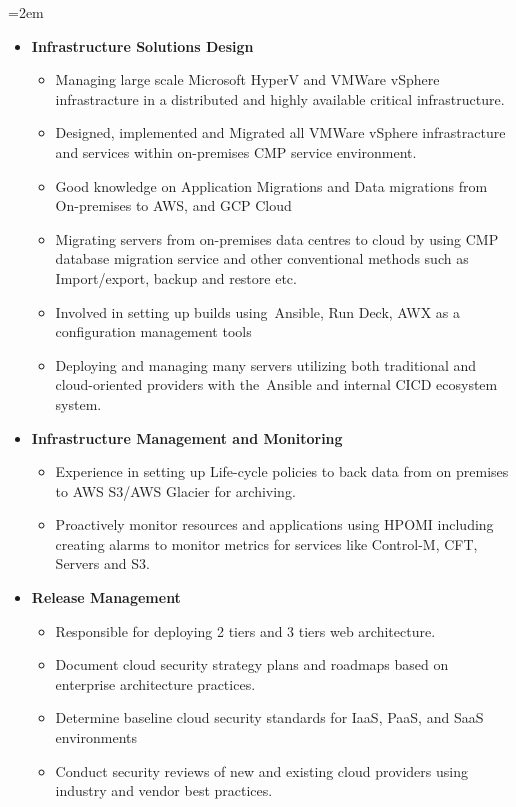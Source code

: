 \documentclass{scrartcl}
\newcommand{\MarginText}[1]{\marginpar{\raggedleft\itshape\small#1}} %
\newcommand{\Description}[1]{\hangindent=2em\hangafter=0\noindent\raggedright\footnotesize{#1}\par\normalsize\vspace{1em}} %
\begin{document}
\begin{cv}{}
\Description{\MarginText{Credit Agricole, Singapore}
	\begin{itemize}
		\item \textbf{Infrastructure Solutions Design}
		\begin{itemize}
			\item Managing large scale Microsoft HyperV and VMWare vSphere infrastracture in a distributed and highly available critical infrastructure.
			\item Designed, implemented and Migrated all VMWare vSphere infrastracture and services within on-premises CMP service environment.
			\item Good knowledge on Application Migrations and Data migrations from On-premises to AWS, and GCP Cloud
			\item Migrating servers from on-premises data centres to cloud by using CMP database migration service and other conventional methods such as Import/export, backup and restore etc.
			\item Involved in setting up builds using Ansible, Run Deck, AWX as a configuration management tools
			\item Deploying and managing many servers utilizing both traditional and cloud-oriented providers with the Ansible and internal CICD ecosystem system.
		\end{itemize}
		\item \textbf{Infrastructure Management and Monitoring}
		\begin{itemize}
			\item Experience in setting up Life-cycle policies to back data from on premises to AWS S3/AWS Glacier for archiving.
			\item Proactively monitor resources and applications using HPOMI including creating alarms to monitor metrics for services like Control-M, CFT, Servers and S3.
		\end{itemize}
		\item \textbf{Release Management}
		\begin{itemize}
			\item Responsible for deploying 2 tiers and 3 tiers web architecture.
			\item Document cloud security strategy plans and roadmaps based on enterprise architecture practices.
			\item Determine baseline cloud security standards for IaaS, PaaS, and SaaS environments
			\item Conduct security reviews of new and existing cloud providers using industry and vendor best practices.

\end{itemize}
\end{itemize}}
\end{cv}
\end{document}
